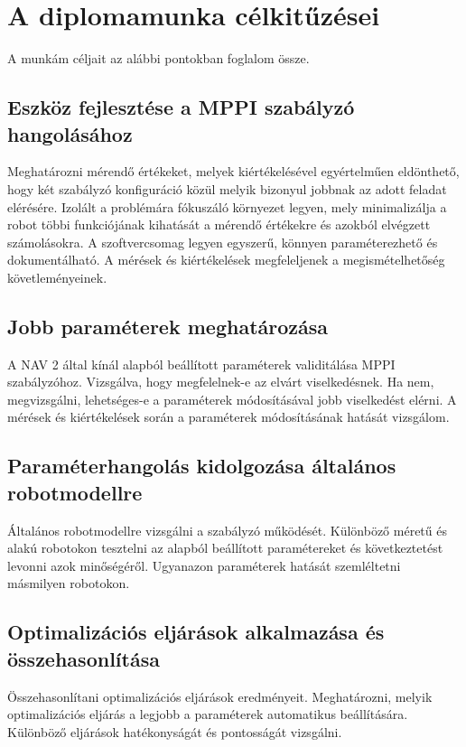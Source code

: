 \section{A diplomamunka célkitűzései}
A munkám céljait az alábbi pontokban foglalom össze.
\subsection{Eszköz fejlesztése a MPPI szabályzó hangolásához}
Meghatározni mérendő értékeket, melyek kiértékelésével egyértelműen eldönthető, hogy két szabályzó konfiguráció közül melyik bizonyul jobbnak az adott feladat elérésére. Izolált a problémára fókuszáló környezet legyen, mely minimalizálja a robot többi funkciójának kihatását a mérendő értékekre és azokból elvégzett számolásokra. A szoftvercsomag legyen egyszerű, könnyen paraméterezhető és dokumentálható. A mérések és kiértékelések megfeleljenek a megismételhetőség követleményeinek.
\subsection{Jobb paraméterek meghatározása}
A NAV 2 által kínál alapból beállított paraméterek validitálása MPPI szabályzóhoz. Vizsgálva, hogy megfelelnek-e az elvárt viselkedésnek. Ha nem, megvizsgálni, lehetséges-e a paraméterek módosításával jobb viselkedést elérni. A mérések és kiértékelések során a paraméterek módosításának hatását vizsgálom.
\subsection{Paraméterhangolás kidolgozása általános robotmodellre}
Általános robotmodellre vizsgálni a szabályzó működését. Különböző méretű és alakú robotokon tesztelni az alapból beállított paramétereket és következtetést levonni azok minőségéről. Ugyanazon paraméterek hatását szemléltetni másmilyen robotokon.
\subsection{Optimalizációs eljárások alkalmazása és összehasonlítása}
Összehasonlítani optimalizációs eljárások eredményeit. Meghatározni, melyik optimalizációs eljárás a legjobb a paraméterek automatikus beállítására. Különböző eljárások hatékonyságát és pontosságát vizsgálni.
